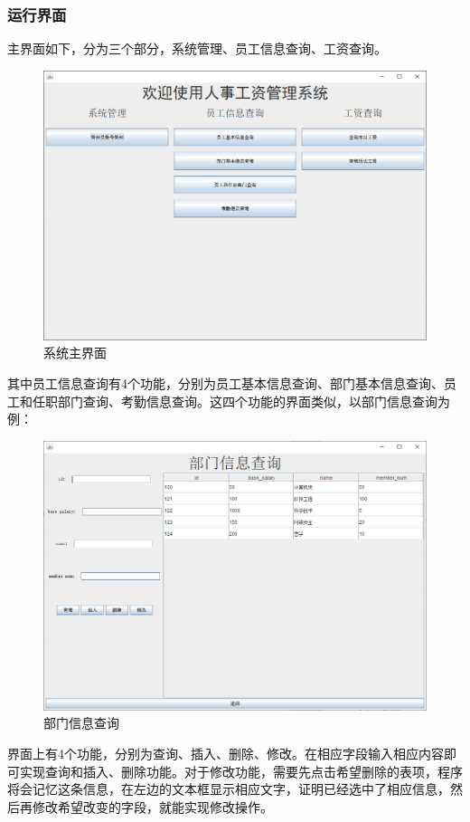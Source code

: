 \documentclass[withoutpreface,bwprint]{cumcmthesis} %
\begin{document}
\subsubsection{运行界面}
主界面如下，分为三个部分，系统管理、员工信息查询、工资查询。
\begin{figure}[H]
    \centering
    \includegraphics[width=0.8\linewidth]{main}
    \caption{系统主界面}
\end{figure}
其中员工信息查询有4个功能，分别为员工基本信息查询、部门基本信息查询、员工和任职部门查询、考勤信息查询。这四个功能的界面类似，以部门信息查询为例：
\begin{figure}[H]
    \centering
    \includegraphics[width=0.8\linewidth]{department}
    \caption{部门信息查询}
\end{figure}
界面上有4个功能，分别为查询、插入、删除、修改。在相应字段输入相应内容即可实现查询和插入、删除功能。对于修改功能，需要先点击希望删除的表项，程序将会记忆这条信息，在左边的文本框显示相应文字，证明已经选中了相应信息，然后再修改希望改变的字段，就能实现修改操作。
\end{document}

